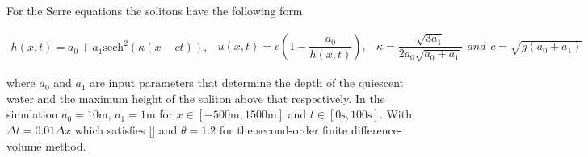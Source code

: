\documentclass[SingleSpace,12pt,Proceedings]{Serre_ASCE}
\begin{document}
For the Serre equations the solitons have the following form
\begin{linenomath*}
\begin{subequations}
\begin{gather}
h\left(x,t\right) = a_0 + a_1\text{sech}^2\left( \kappa\left(x - ct\right)\right),
\end{gather}
\begin{gather}
u\left(x,t\right) = c\left(1 - \dfrac{a_0}{h(x,t)} \right),
\end{gather}
\begin{gather}
\kappa = \dfrac{\sqrt{3a_1}}{2a_0 \sqrt{ a_0 + a_1}}
\end{gather}
and
\begin{gather}
c = \sqrt{g \left(a_0 + a_1\right)}
\end{gather}
\end{subequations}
\label{eq:sol}
\end{linenomath*}
where $a_0$ and $a_1$ are input parameters that determine the depth of the quiescent water and the maximum height of the soliton above that respectively. In the simulation $a_0 = 10\text{m}$, $a_1 = 1\text{m}$ for $x\in\left[-500\text{m},1500\text{m}\right]$ and $t\in\left[0\text{s},100\text{s}\right]$. With $\Delta t = 0.01 \Delta x$ which satisfies [] and $\theta = 1.2$ for the second-order finite difference-volume method.


\end{document}
